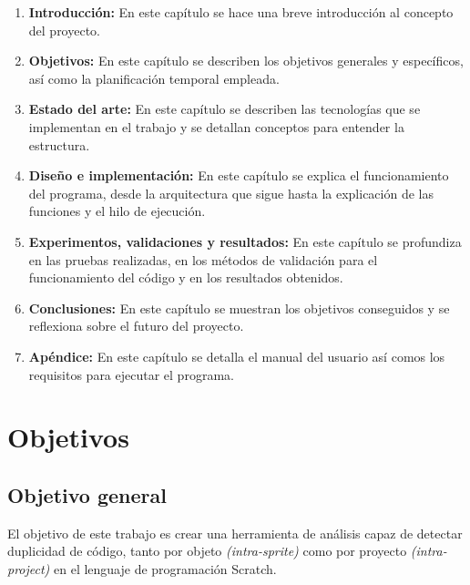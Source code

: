 \documentclass[a4paper, 12pt]{book}
\begin{document}
\begin{enumerate}
  	\item \textbf{Introducción:} En este capítulo se hace una breve introducción al concepto del proyecto. 
  	\item \textbf{Objetivos:} En este capítulo se describen los objetivos generales y específicos, así como la planificación temporal empleada.
  	\item \textbf{Estado del arte:} En este capítulo se describen las tecnologías que se implementan en el trabajo y se detallan conceptos para entender la estructura.
  	\item \textbf{Diseño e implementación:} En este capítulo se explica el funcionamiento del programa, desde la arquitectura que sigue hasta la explicación de las funciones y el hilo de ejecución.
  	\item \textbf{Experimentos, validaciones y resultados:} En este capítulo se profundiza en las pruebas realizadas, en los métodos de validación para el funcionamiento del código y en los resultados obtenidos.
  	\item \textbf{Conclusiones:} En este capítulo se muestran los objetivos conseguidos y se reflexiona sobre el futuro del proyecto.
  	\item \textbf{Apéndice:} En este capítulo se detalla el manual del usuario así comos los requisitos para ejecutar el programa.  
\end{enumerate}


\cleardoublepage %
\chapter{Objetivos} %
\label{chap:objetivos} %

\section{Objetivo general} %
\label{sec:objetivo-general} %

El objetivo de este trabajo es crear una herramienta de análisis capaz de detectar duplicidad de código, tanto por objeto \textit{(intra-sprite)} como por proyecto \textit{(intra-project)} en el lenguaje de programación Scratch.
\end{document}
